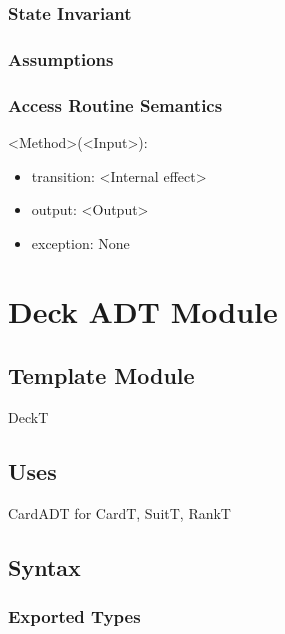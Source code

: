 \documentclass[12pt]{article}
\begin{document}
\subsubsection*{State Invariant}

\subsubsection*{Assumptions}

\begin{itemize}
\end{itemize}

\subsubsection*{Access Routine Semantics}

<Method>(<Input>):
\begin{itemize}
    \item transition: <Internal effect>
    \item output: <Output>
    \item exception: None
\end{itemize}


\newpage %

\newpage

\section*{Deck ADT Module}

\subsection*{Template Module}

DeckT

\subsection*{Uses}

CardADT for CardT, SuitT, RankT\\

\subsection*{Syntax}

\subsubsection*{Exported Types}
\end{document}
